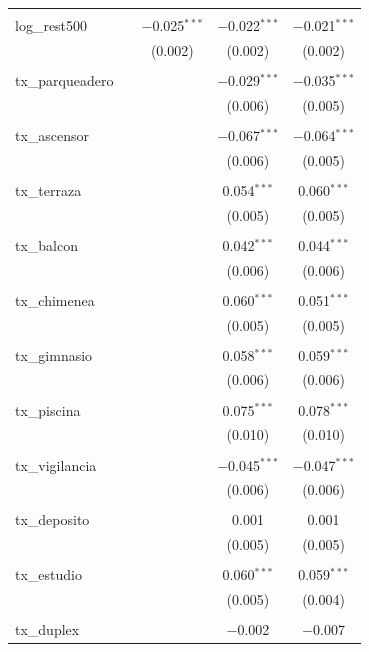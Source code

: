\begin{table}[!htbp]
\begin{tabular}{@{\extracolsep{5pt}}lcccc}
  & & & & \\ 
 log\_rest500 &  & $-$0.025$^{***}$ & $-$0.022$^{***}$ & $-$0.021$^{***}$ \\ 
  &  & (0.002) & (0.002) & (0.002) \\ 
  & & & & \\ 
 tx\_parqueadero &  &  & $-$0.029$^{***}$ & $-$0.035$^{***}$ \\ 
  &  &  & (0.006) & (0.005) \\ 
  & & & & \\ 
 tx\_ascensor &  &  & $-$0.067$^{***}$ & $-$0.064$^{***}$ \\ 
  &  &  & (0.006) & (0.005) \\ 
  & & & & \\ 
 tx\_terraza &  &  & 0.054$^{***}$ & 0.060$^{***}$ \\ 
  &  &  & (0.005) & (0.005) \\ 
  & & & & \\ 
 tx\_balcon &  &  & 0.042$^{***}$ & 0.044$^{***}$ \\ 
  &  &  & (0.006) & (0.006) \\ 
  & & & & \\ 
 tx\_chimenea &  &  & 0.060$^{***}$ & 0.051$^{***}$ \\ 
  &  &  & (0.005) & (0.005) \\ 
  & & & & \\ 
 tx\_gimnasio &  &  & 0.058$^{***}$ & 0.059$^{***}$ \\ 
  &  &  & (0.006) & (0.006) \\ 
  & & & & \\ 
 tx\_piscina &  &  & 0.075$^{***}$ & 0.078$^{***}$ \\ 
  &  &  & (0.010) & (0.010) \\ 
  & & & & \\ 
 tx\_vigilancia &  &  & $-$0.045$^{***}$ & $-$0.047$^{***}$ \\ 
  &  &  & (0.006) & (0.006) \\ 
  & & & & \\ 
 tx\_deposito &  &  & 0.001 & 0.001 \\ 
  &  &  & (0.005) & (0.005) \\ 
  & & & & \\ 
 tx\_estudio &  &  & 0.060$^{***}$ & 0.059$^{***}$ \\ 
  &  &  & (0.005) & (0.004) \\ 
  & & & & \\ 
 tx\_duplex &  &  & $-$0.002 & $-$0.007 \\ 

\end{tabular}
\end{table}
